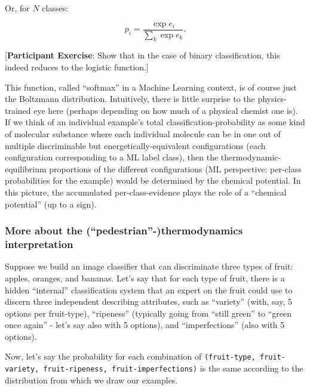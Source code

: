 \documentclass[11pt]{article}
\begin{document}
Or, for \(N\) classes:

\[p_i=\frac{\exp e_i}{\sum_k \exp e_k}.\]

{[}\textbf{Participant Exercise}: Show that in the case of binary
classification, this indeed reduces to the logistic function.{]}

This function, called ``softmax'' in a Machine Learning context, is of
course just the Boltzmann distribution. Intuitively, there is little
surprise to the physics-trained eye here (perhaps depending on how much
of a physical chemist one is). If we think of an individual example's
total classification-probability as some kind of molecular substance
where each individual molecule can be in one out of multiple
discriminable but energetically-equivalent configurations (each
configuration corresponding to a ML label class), then the
thermodynamic-equilibrium proportions of the different configurations
(ML perspective: per-class probabilities for the example) would be
determined by the chemical potential. In this picture, the accumulated
per-class-evidence plays the role of a ``chemical potential'' (up to a
sign).

    \hypertarget{more-about-the-pedestrian-thermodynamics-interpretation}{%
\subsubsection{More about the (``pedestrian''-)thermodynamics
interpretation}\label{more-about-the-pedestrian-thermodynamics-interpretation}}

Suppose we build an image classifier that can discriminate three types
of fruit: apples, oranges, and bananas. Let's say that for each type of
fruit, there is a hidden ``internal'' classification system that an
expert on the fruit could use to discern three independent describing
attributes, such as ``variety'' (with, say, 5 options per fruit-type),
``ripeness'' (typically going from ``still green'' to ``green once
again'' - let's say also with 5 options), and ``imperfections'' (also
with 5 options).

Now, let's say the probability for each combination of
\texttt{(fruit-type,\ fruit-variety,\ fruit-ripeness,\ fruit-imperfections)}
is the same according to the distribution from which we draw our
examples.
\end{document}
